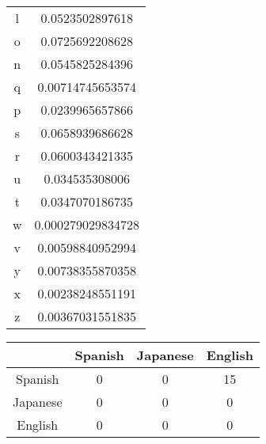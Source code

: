 \documentclass{article}
\begin{document}
\begin{center}
\begin{tabular}{c|c}
l & 0.0523502897618 \\
o & 0.0725692208628 \\
n & 0.0545825284396 \\
q & 0.00714745653574 \\
p & 0.0239965657866 \\
s & 0.0658939686628 \\
r & 0.0600343421335 \\
u & 0.034535308006 \\
t & 0.0347070186735 \\
w & 0.000279029834728 \\
v & 0.00598840952994 \\
y & 0.00738355870358 \\
x & 0.00238248551191 \\
z & 0.00367031551835 \\
\end{tabular}\end{center}

\begin{center}
\begin{tabular}{|c|c|c|c|}
\hline & Spanish & Japanese & English \\ \hline
Spanish & 0 & 0 & 15 \\ \hline
Japanese & 0 & 0 & 0 \\ \hline
English & 0 & 0 & 0 \\ \hline
\end{tabular}
\end{center}
\end{document}
